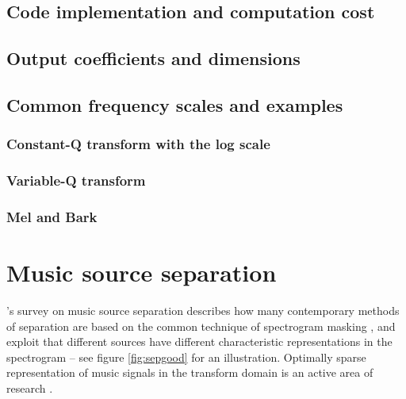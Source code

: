 \documentclass[letter,12pt,notitlepage]{article}
\begin{document}

\subsection{Code implementation and computation cost}


\subsection{Output coefficients and dimensions}


\subsection{Common frequency scales and examples}

\subsubsection{Constant-Q transform with the log scale}

\subsubsection{Variable-Q transform}

\subsubsection{Mel and Bark}

\vfill
\clearpage

\section{Music source separation}
\label{sec:musicsep}

\citet{musicsepgood}'s survey on music source separation describes how many contemporary methods of separation are based on the common technique of spectrogram masking \cite{masking, speechmask, musicmask}, and exploit that different sources have different characteristic representations in the spectrogram -- see figure \ref{fig:sepgood} for an illustration. Optimally sparse representation of music signals in the transform domain is an active area of research \cite{sparsitykowalski, sparsitykowalski2}.
\end{document}

